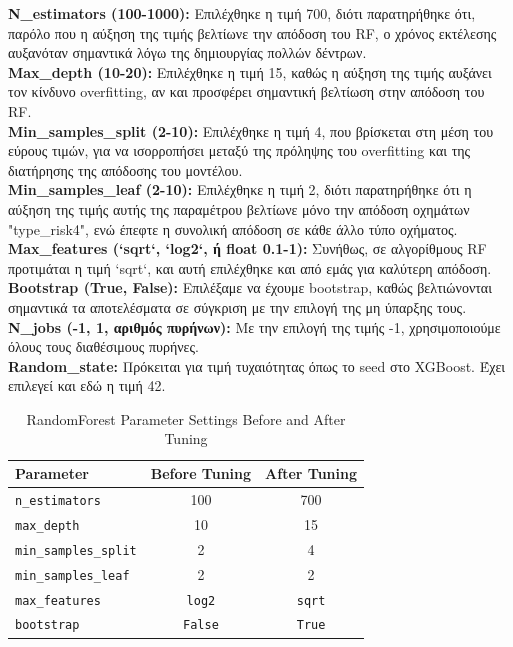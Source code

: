\documentclass{llncs}
\begin{document}
\noindent \textbf{N\_estimators (100-1000):}
Επιλέχθηκε η τιμή 700, διότι παρατηρήθηκε ότι, παρόλο που η αύξηση της τιμής βελτίωνε την απόδοση του RF, ο χρόνος εκτέλεσης αυξανόταν σημαντικά λόγω της δημιουργίας πολλών δέντρων.\\

\noindent \textbf{Max\_depth (10-20):}
Επιλέχθηκε η τιμή 15, καθώς η αύξηση της τιμής αυξάνει τον κίνδυνο overfitting, αν και προσφέρει σημαντική βελτίωση στην απόδοση του RF. \\

\noindent \textbf{Min\_samples\_split (2-10):}
Επιλέχθηκε η τιμή 4, που βρίσκεται στη μέση του εύρους τιμών, για να ισορροπήσει μεταξύ της πρόληψης του overfitting και της διατήρησης της απόδοσης του μοντέλου.\\

\noindent \textbf{Min\_samples\_leaf (2-10):}
Επιλέχθηκε η τιμή 2, διότι παρατηρήθηκε ότι η αύξηση της τιμής αυτής της παραμέτρου βελτίωνε μόνο την απόδοση οχημάτων "type\_risk4", ενώ έπεφτε η συνολική απόδοση σε κάθε άλλο τύπο οχήματος. \\

\noindent \textbf{Max\_features (`sqrt`, `log2`, ή float 0.1-1):}
Συνήθως, σε αλγορίθμους RF προτιμάται η τιμή `sqrt`, και αυτή επιλέχθηκε και από εμάς για καλύτερη απόδοση. \\

\noindent \textbf{Bootstrap (True, False):}
Επιλέξαμε να έχουμε bootstrap, καθώς βελτιώνονται σημαντικά τα αποτελέσματα σε σύγκριση με την επιλογή της μη ύπαρξης τους.\\

\noindent \textbf{N\_jobs (-1, 1, αριθμός πυρήνων):}
Με την επιλογή της τιμής -1, χρησιμοποιούμε όλους τους διαθέσιμους πυρήνες.\\

\noindent \textbf{Random\_state:}
Πρόκειται για τιμή τυχαιότητας όπως το seed στο XGBoost. Έχει επιλεγεί και εδώ η τιμή 42.\\

\begin{table}[h!]
    \centering
    \begin{tabular}{l|cc}
        \hline
        Parameter & Before Tuning & After Tuning \\
        \hline
        \texttt{n\_estimators} & 100 & 700 \\
        \texttt{max\_depth} & 10 & 15 \\
        \texttt{min\_samples\_split} & 2 & 4 \\
        \texttt{min\_samples\_leaf} & 2 & 2 \\
        \texttt{max\_features} & \texttt{log2} & \texttt{sqrt} \\
        \texttt{bootstrap} & \texttt{False} & \texttt{True} \\
        \hline
    \end{tabular}
    \caption{RandomForest Parameter Settings Before and After Tuning}
\end{table}
\end{document}
